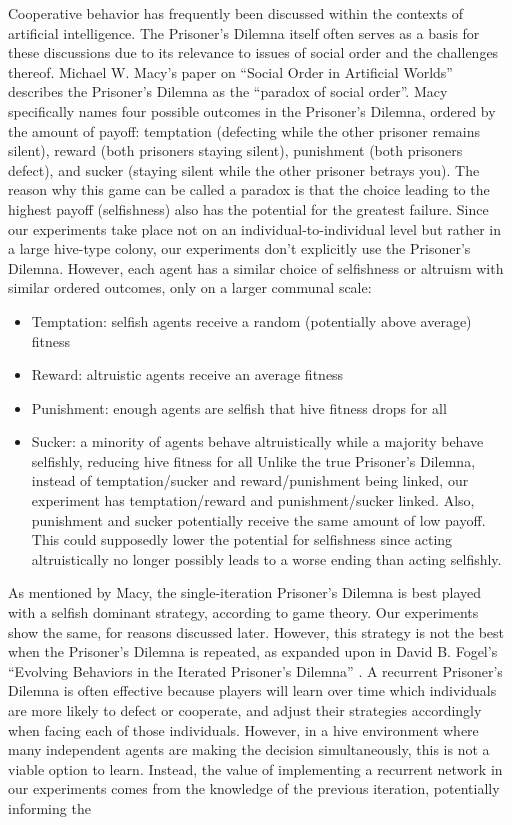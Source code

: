 \documentclass[11pt]{article}
\begin{document}
		Cooperative behavior has frequently been discussed within the contexts of artificial intelligence. The Prisoner's Dilemna itself often serves as a basis for these discussions due to its relevance to issues of social order and the challenges thereof. Michael W. Macy's paper on ``Social Order in Artificial Worlds'' describes the Prisoner's Dilemna as the ``paradox of social order''. \cite{macy} Macy specifically names four possible outcomes in the Prisoner's Dilemna, ordered by the amount of payoff: temptation (defecting while the other prisoner remains silent), reward (both prisoners staying silent), punishment (both prisoners defect), and sucker (staying silent while the other prisoner betrays you). The reason why this game can be called a paradox is that the choice leading to the highest payoff (selfishness) also has the potential for the greatest failure. Since our experiments take place not on an individual-to-individual level but rather in a large hive-type colony, our experiments don't explicitly use the Prisoner's Dilemna. However, each agent has a similar choice of selfishness or altruism with similar ordered outcomes, only on a larger communal scale:
		\begin{itemize}
			\item Temptation: selfish agents receive a random (potentially above average) fitness
			\item Reward: altruistic agents receive an average fitness
			\item Punishment: enough agents are selfish that hive fitness drops for all
			\item Sucker: a minority of agents behave altruistically while a majority behave selfishly, reducing hive fitness for all
			Unlike the true Prisoner's Dilemna, instead of temptation/sucker and reward/punishment being linked, our experiment has temptation/reward and punishment/sucker linked. Also, punishment and sucker potentially receive the same amount of low payoff. This could supposedly lower the potential for selfishness since acting altruistically no longer possibly leads to a worse ending than acting selfishly.
		\end{itemize}
		As mentioned by Macy, the single-iteration Prisoner's Dilemna is best played with a selfish dominant strategy, according to game theory. Our experiments show the same, for reasons discussed later. However, this strategy is not the best when the Prisoner's Dilemna is repeated, as expanded upon in David B. Fogel's ``Evolving Behaviors in the Iterated Prisoner's Dilemna'' \cite{fogel}. A recurrent Prisoner's Dilemna is often effective because players will learn over time which individuals are more likely to defect or cooperate, and adjust their strategies accordingly when facing each of those individuals. However, in a hive environment where many independent agents are making the decision simultaneously, this is not a viable option to learn. Instead, the value of implementing a recurrent network in our experiments comes from the knowledge of the previous iteration, potentially informing the 
\end{document}
